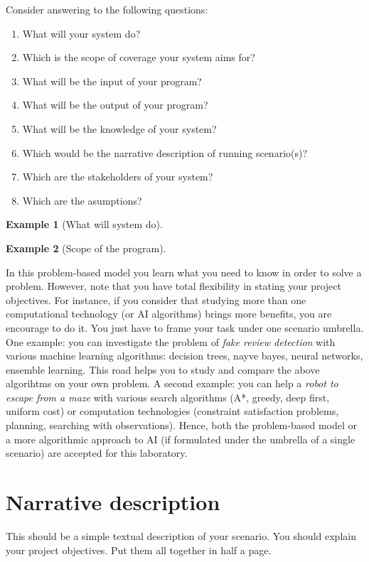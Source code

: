\documentclass[a4paper,12pt]{report}
\newtheorem{example}{Example}
\begin{document}
Consider answering to the following questions:
\begin{enumerate}
 \item What will your system do?
\item Which is the scope of coverage your system aims for?
\item What will be the input of your program?
\item What will be the output of your program?
\item What will be the knowledge of your system?
\item Which would be the narrative description of running scenario(s)?
\item Which are the stakeholders of your system?
\item Which are the asumptions?
\end{enumerate}

\begin{example}[What will system do]
 
\end{example}

\begin{example}[Scope of the program]
 
\end{example}

In this problem-based model you learn what you 
need to know in order to solve a problem. 
However, note that you have total flexibility in stating your project objectives.
For instance, if you consider that studying more 
than one computational technology (or AI algorithms) brings more benefits, 
you are encourage to do it. 
You just have to frame your task under one scenario umbrella. 
One example: you can investigate the problem of {\it fake review detection} with 
various machine learning algorithms: decision trees, nayve bayes, neural networks, ensemble learning. 
This road helps you to study and compare the above algorihtms on your own problem.
A second example: you can help a {\it robot to escape from a maze} 
with various search algorithms (A*, greedy, deep first, uniform cost) 
or computation technologies (constraint satisfaction problems, planning, 
searching with observations).
Hence, both the problem-based model or a more algorithmic approach to AI 
(if formulated under the umbrella of a single scenario) 
are accepted for this laboratory.



\section{Narrative description}
This should be a simple textual description of your scenario.
You should explain your project objectives.
Put them all together in half a page.
\end{document}
